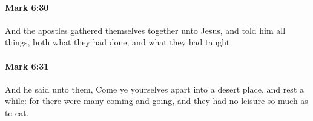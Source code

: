 		\paragraph{Mark 6:30} %
			\label{MARK-6-30}

			And the apostles gathered themselves together unto Jesus, and told him all things, both what they had done, and what they had taught.

			\begin{framed}
			\scriptsize
				\begin{compactdesc}
					\item[SBLG] 
				\end{compactdesc}
			\end{framed}

		\paragraph{Mark 6:31} %
			\label{MARK-6-31}

			And he said unto them, Come ye yourselves apart into a desert place, and rest a while: for there were many coming and going, and they had no leisure so much as to eat.

